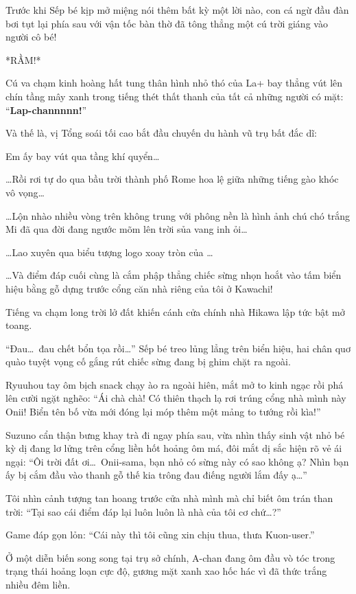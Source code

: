 \documentclass[../main.tex]{subfiles}
\begin{document}
Trước khi Sếp bé kịp mở miệng nói thêm bất kỳ một lời nào, con cá ngừ đầu đàn bơi tụt lại phía sau với vận tốc bàn thờ đã tông thẳng một cú trời giáng vào người cô bé!

*RẦM!*

Cú va chạm kinh hoàng hất tung thân hình nhỏ thó của La+ bay thẳng vút lên chín tầng mây xanh trong tiếng thét thất thanh của tất cả những người có mặt: ``\textbf{Lap-channnnn!}''

Và thế là, vị Tổng soái tối cao bắt đầu chuyến du hành vũ trụ bất đắc dĩ:

Em ấy bay vút qua tầng khí quyển\dots

\dots Rồi rơi tự do qua bầu trời thành phố Rome hoa lệ giữa những tiếng gào khóc vô vọng\dots

\dots Lộn nhào nhiều vòng trên không trung với phông nền là hình ảnh chú chó trắng Mi đã qua đời đang ngước mõm lên trời sủa vang inh ỏi\dots

\dots Lao xuyên qua biểu tượng logo xoay tròn của \hll \dots

\dots Và điểm đáp cuối cùng là cắm phập thẳng chiếc sừng nhọn hoắt vào tấm biển hiệu bằng gỗ dựng trước cổng căn nhà riêng của tôi ở Kawachi!

Tiếng va chạm long trời lở đất khiến cánh cửa chính nhà Hikawa lập tức bật mở toang.

``Đau\dots\ đau chết bổn tọa rồi\dots'' Sếp bé treo lủng lẳng trên biển hiệu, hai chân quơ quào tuyệt vọng cố gắng rút chiếc sừng đang bị ghim chặt ra ngoài.

Ryuuhou tay ôm bịch snack chạy ào ra ngoài hiên, mắt mở to kinh ngạc rồi phá lên cười ngặt nghẽo: ``Ái chà chà! Có thiên thạch lạ rơi trúng cổng nhà mình này Onii! Biển tên bố vừa mới đóng lại móp thêm một mảng to tướng rồi kìa!''

Suzuno cẩn thận bưng khay trà đi ngay phía sau, vừa nhìn thấy sinh vật nhỏ bé kỳ dị đang lơ lửng trên cổng liền hốt hoảng ôm má, đôi mắt dị sắc hiện rõ vẻ ái ngại: ``Ôi trời đất ơi\dots\ Onii-sama, bạn nhỏ có sừng này có sao không ạ? Nhìn bạn ấy bị cắm đầu vào thanh gỗ thế kia trông đau điếng người lắm đấy ạ\dots''

Tôi nhìn cảnh tượng tan hoang trước cửa nhà mình mà chỉ biết ôm trán than trời: ``Tại sao cái điểm đáp lại luôn luôn là nhà của tôi cơ chứ\dots?''

Game đáp gọn lỏn: ``Cái này thì tôi cũng xin chịu thua, thưa Kuon-user.''

\pov{-}

Ở một diễn biến song song tại trụ sở chính, A-chan đang ôm đầu vò tóc trong trạng thái hoảng loạn cực độ, gương mặt xanh xao hốc hác vì đã thức trắng nhiều đêm liền.
\end{document}
